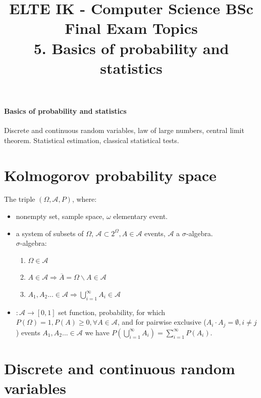 \documentclass[margin=0px]{article}
\title{\textbf{{\Large ELTE IK - Computer Science BSc} \vspace{0.2cm} \\ {\huge Final Exam Topics}} \vspace{0.3cm} \\ 5. Basics of probability and statistics}
\author{}
\date{}
\newenvironment{tetel}[1]{\paragraph{#1 \\}}{}
\begin{document}
\maketitle

\begin{center}
\end{center}

\begin{tetel}{Basics of probability and statistics}
    Discrete and continuous random variables, law of large numbers, central limit theorem. Statistical estimation, classical statistical tests.
\end{tetel}

\section{Kolmogorov probability space}

The triple $(\Omega, \mathcal{A}, P)$, where:
\begin{itemize}
    \item [$\Omega$] nonempty set, sample space, $\omega$ elementary event.
    \item [$\mathcal{A}$] a system of subsets of $\Omega$, $\mathcal{A} \subset 2^{\Omega}, A \in \mathcal{A}$ events, $\mathcal{A}$ a $\sigma$-algebra. \\
          $\sigma$-algebra:
          \begin{enumerate}
              \item $\Omega \in \mathcal{A}$
              \item $A \in \mathcal{A} \Rightarrow \overline{A} = \Omega \backslash A \in \mathcal{A}$
              \item $A_{1}, A_{2}... \in \mathcal{A} \Rightarrow \bigcup_{i=1}^{\infty}{A_{i}} \in \mathcal{A}$
          \end{enumerate}
    \item [$P$] $: \mathcal{A} \to [0,1]$ set function, probability, for which $P(\Omega) = 1, P(A) \geq 0, \forall A \in \mathcal{A}$, and for pairwise exclusive ($A_{i} \cdot A_{j} = \emptyset, i \neq j$) events $A_{1}, A_{2}... \in \mathcal{A}$ we have $P(\bigcup_{i=1}^{\infty}{A_{i}}) = \sum_{i=1}^{\infty}{P(A_{i})}$.
\end{itemize}

\section{Discrete and continuous random variables}
\end{document}
